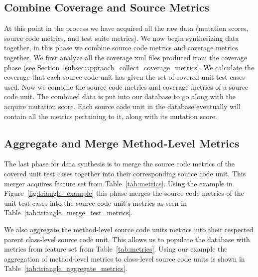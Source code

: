 \subsection{Combine Coverage and Source Metrics}
\label{subsec:appraoch_combine_metrics}
At this point in the process we have acquired all the raw data (mutation scores, source code metrics, and test suite metrics). We now begin synthesizing data together, in this phase we combine source code metrics and coverage metrics together. We first analyze all the coverage \gls{xml} files produced from the coverage phase (see Section~\ref{subsec:appraoch_collect_coverage_metrics}. We calculate the coverage that each source code unit has given the set of covered unit test cases used. Now we combine the source code metrics and coverage metrics of a source code unit. The combined data is put into our database to go along with the acquire mutation score. Each source code unit in the database eventually will contain all the metrics pertaining to it, along with its mutation score.


\subsection{Aggregate and Merge Method-Level Metrics}
\label{subsec:appraoch_aggregate_merge_metrics}
The last phase for data synthesis is to merge the source code metrics of the covered unit test cases together into their corresponding source code unit. This merger acquires feature set  from Table~\ref{tab:metrics}. Using the example in Figure~\ref{fig:triangle_example} this phase merges the source code metrics of the unit test cases into the source code unit's metrics as seen in Table~\ref{tab:triangle_merge_test_metrics}.

We also aggregate the method-level source code units metrics into their respected parent class-level source code unit. This allows us to populate the database with metrics from feature set  from Table~\ref{tab:metrics}. Using our example the aggregation of method-level metrics to class-level source code units is shown in Table~\ref{tab:triangle_aggregate_metrics}.


